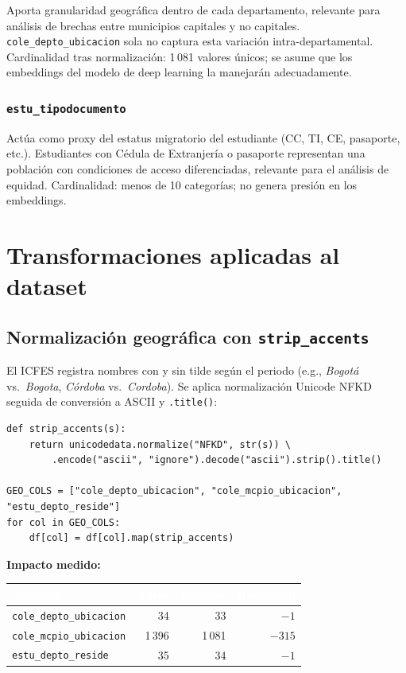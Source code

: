 \documentclass[12pt, a4paper]{article}
\newcommand{\thead}[1]{\cellcolor{tabheader}\textcolor{white}{\textbf{#1}}}
\begin{document}
Aporta granularidad geográfica dentro de cada departamento, relevante para
análisis de brechas entre municipios capitales y no capitales.
\texttt{cole\_depto\_ubicacion} sola no captura esta variación intra-departamental.
Cardinalidad tras normalización: 1\,081 valores únicos; se asume que los embeddings
del modelo de deep learning la manejarán adecuadamente.

\subsubsection{\texttt{estu\_tipodocumento}}

Actúa como proxy del estatus migratorio del estudiante (CC, TI, CE, pasaporte,
etc.). Estudiantes con Cédula de Extranjería o pasaporte representan una población
con condiciones de acceso diferenciadas, relevante para el análisis de equidad.
Cardinalidad: menos de 10 categorías; no genera presión en los embeddings.

\section{Transformaciones aplicadas al dataset}

\subsection{Normalización geográfica con \texttt{strip\_accents}}

El ICFES registra nombres con y sin tilde según el periodo
(e.g., \emph{Bogotá} vs.\ \emph{Bogota}, \emph{Córdoba} vs.\ \emph{Cordoba}).
Se aplica normalización Unicode NFKD seguida de conversión a ASCII y
\texttt{.title()}:

\begin{lstlisting}
def strip_accents(s):
    return unicodedata.normalize("NFKD", str(s)) \
        .encode("ascii", "ignore").decode("ascii").strip().title()

GEO_COLS = ["cole_depto_ubicacion", "cole_mcpio_ubicacion", "estu_depto_reside"]
for col in GEO_COLS:
    df[col] = df[col].map(strip_accents)
\end{lstlisting}

\textbf{Impacto medido:}

\vspace{4pt}
\begin{tabular}{lrrr}
  \toprule
  \thead{Columna} & \thead{Antes} & \thead{Después} & \thead{Reducción} \\
  \midrule
  \rowcolor{rowalt}
  \texttt{cole\_depto\_ubicacion} & 34 & 33 & $-1$ \\
  \texttt{cole\_mcpio\_ubicacion} & 1\,396 & 1\,081 & $-315$ \\
  \rowcolor{rowalt}
  \texttt{estu\_depto\_reside}    & 35 & 34 & $-1$ \\
  \bottomrule
\end{tabular}
\vspace{6pt}
\end{document}
